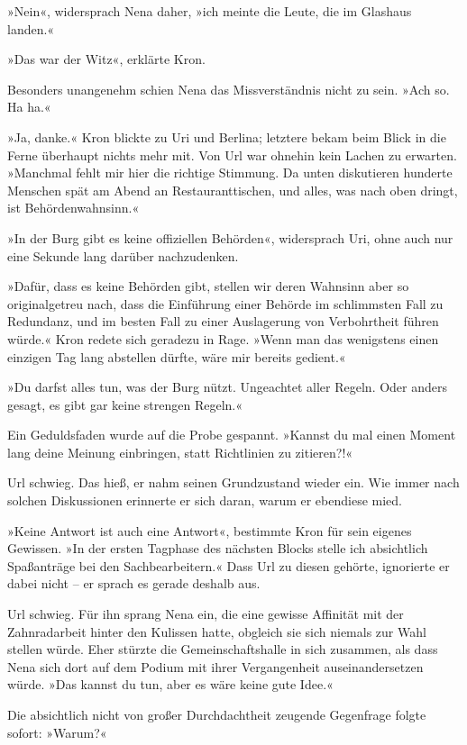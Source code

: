»Nein«, widersprach Nena daher, »ich meinte die Leute, die im Glashaus landen.«

»Das war der Witz«, erklärte Kron.

Besonders unangenehm schien Nena das Missverständnis nicht zu sein. »Ach so. Ha ha.«

»Ja, danke.« Kron blickte zu Uri und Berlina; letztere bekam beim Blick in die Ferne überhaupt nichts mehr mit. Von Url war ohnehin kein Lachen zu erwarten. »Manchmal fehlt mir hier die richtige Stimmung. Da unten diskutieren hunderte Menschen spät am Abend an Restauranttischen, und alles, was nach oben dringt, ist Behördenwahnsinn.«

»In der Burg gibt es keine offiziellen Behörden«, widersprach Uri, ohne auch nur eine Sekunde lang darüber nachzudenken.

»Dafür, dass es keine Behörden gibt, stellen wir deren Wahnsinn aber so originalgetreu nach, dass die Einführung einer Behörde im schlimmsten Fall zu Redundanz, und im besten Fall zu einer Auslagerung von Verbohrtheit führen würde.« Kron redete sich geradezu in Rage. »Wenn man das wenigstens einen einzigen Tag lang abstellen dürfte, wäre mir bereits gedient.«

»Du darfst alles tun, was der Burg nützt. Ungeachtet aller Regeln. Oder anders gesagt, es gibt gar keine strengen Regeln.«

Ein Geduldsfaden wurde auf die Probe gespannt. »Kannst du mal einen Moment lang deine Meinung einbringen, statt Richtlinien zu zitieren?!«

Url schwieg. Das hieß, er nahm seinen Grundzustand wieder ein. Wie immer nach solchen Diskussionen erinnerte er sich daran, warum er ebendiese mied.

»Keine Antwort ist auch eine Antwort«, bestimmte Kron für sein eigenes Gewissen. »In der ersten Tagphase des nächsten Blocks stelle ich absichtlich Spaßanträge bei den Sachbearbeitern.« Dass Url zu diesen gehörte, ignorierte er dabei nicht – er sprach es gerade deshalb aus.

Url schwieg. Für ihn sprang Nena ein, die eine gewisse Affinität mit der Zahnradarbeit hinter den Kulissen hatte, obgleich sie sich niemals zur Wahl stellen würde. Eher stürzte die Gemeinschaftshalle in sich zusammen, als dass Nena sich dort auf dem Podium mit ihrer Vergangenheit auseinandersetzen würde. »Das kannst du tun, aber es wäre keine gute Idee.«

Die absichtlich nicht von großer Durchdachtheit zeugende Gegenfrage folgte sofort: »Warum?«

